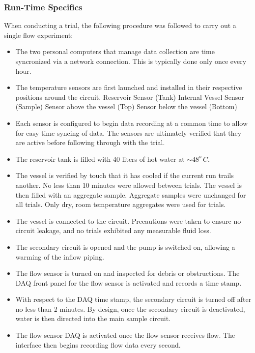 \documentclass[12pt]{article}
\numberwithin{equation}{section}
\numberwithin{table}{section}
\numberwithin{figure}{section}
\begin{document}
\subsubsection*{Run-Time Specifics}

When conducting a trial, the following procedure was followed to carry out a single flow experiment:

\begin{itemize}
 \item The two personal computers that manage data collection are time syncronized via a network connection. This is typically  done only once every hour. 
\pagebreak
 \item The temperature sensors are first launched and installed in their respective positions around the circuit.
	\subitem Reservoir Sensor (Tank)
        \subitem Internal Vessel Sensor (Sample)
	\subitem Sensor above the vessel (Top)
        \subitem Sensor below the vessel (Bottom)
\pagebreak
 \item Each sensor is configured to begin data recording at a common time to allow for easy time syncing of data. The sensors are ultimately verified that they are active before following through with the trial.
 \item The reservoir tank is filled with 40 liters of hot water at $\sim48^{o}\,C$.
 \item The vessel is verified by touch that it has cooled if the current run trails another. No less than 10 minutes were allowed between trials. The vessel is then filled with an aggregate sample. Aggregate samples were unchanged for all trials. Only dry, room temperature aggregates were used for trials.
 \item The vessel is connected to the circuit. Precautions were taken to ensure no circuit leakage, and no trials exhibited any measurable fluid loss.
 \item The secondary circuit is opened and the pump is switched on, allowing a warming of the inflow piping. 
 \item The flow sensor is turned on and inspected for debris or obstructions. The DAQ front panel for the flow sensor is activated and records a time stamp.
 \item With respect to the DAQ time stamp, the secondary circuit is turned off after no less than 2 minutes. By design, once the secondary circuit is deactivated, water is then directed into the main sample circuit. 
 \item The flow sensor DAQ is activated once the flow sensor receives flow. The interface then begins recording flow data every second.

\end{itemize}
\end{document}
